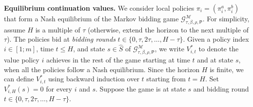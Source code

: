 %

\smallskip
\noindent\textbf{Equilibrium continuation values.}
We consider local policies \(\pi_i=(\pi_i^a,\pi_i^b)\) that form a Nash equilibrium of the Markov bidding game $\mathcal{G}^{\mathcal{M}}_{\tau,\beta,\rho,\mathsf{P}}$.
For simplicity, assume $H$ is a multiple of $\tau$ (otherwise, extend the horizon to the next multiple of $\tau$).
The policies bid at \textit{bidding rounds} $t\in \{0,\tau,2\tau,\ldots,H-\tau\}$.
Given a policy index $i\in [1;m]$, time $t\leq H$, and state $s\in \hat S$ of $\mathcal{G}^{\mathcal{M}}_{\tau,\beta,\rho,\mathsf{P}}$, we write $V^*_{i,t}$ to denote the value policy $i$ achieves in the rest of the game starting at time $t$ and at state $s$, when all the policies follow a Nash equilibrium.
Since the horizon $H$ is finite, we can define $V^*_{i,t}$ using backward induction over $t$ starting from $t=H$.
Set \(V^*_{i,H}(s)=0\) for every \(i\) and \(s\).
Suppose the game is at state \(s\) and bidding round $t\in \{0,\tau,2\tau,\ldots,H-\tau\}$.

